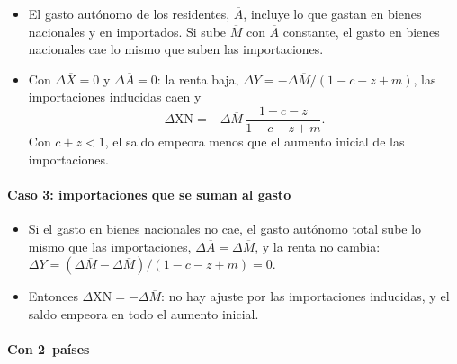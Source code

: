 \documentclass[11pt]{article}
\begin{document}
\begin{itemize}
\item El gasto autónomo de los residentes, $\overline A$, incluye lo que gastan en bienes nacionales y en importados. Si sube $\overline M$ con $\overline A$ constante, el gasto en bienes nacionales cae lo mismo que suben las importaciones.
\item Con $\Delta\overline X=0$ y $\Delta\overline A=0$: la renta baja, $\Delta Y=-\Delta\overline M/(1-c-z+m)$, las importaciones inducidas caen y
  \[
  \Delta\mathrm{XN}=-\Delta\overline M\,\frac{1-c-z}{1-c-z+m}.
  \]
  Con $c+z<1$, el saldo empeora menos que el aumento inicial de las importaciones.
\end{itemize}

\paragraph{Caso 3: importaciones que se suman al gasto}

\begin{itemize}
\item Si el gasto en bienes nacionales no cae, el gasto autónomo total sube lo mismo que las importaciones, $\Delta\overline A=\Delta\overline M$, y la renta no cambia: $\Delta Y=(\Delta\overline M-\Delta\overline M)/(1-c-z+m)=0$.
\item Entonces $\Delta\mathrm{XN}=-\Delta\overline M$: no hay ajuste por las importaciones inducidas, y el saldo empeora en todo el aumento inicial.
\end{itemize}

\paragraph{Con 2~países}
\end{document}
